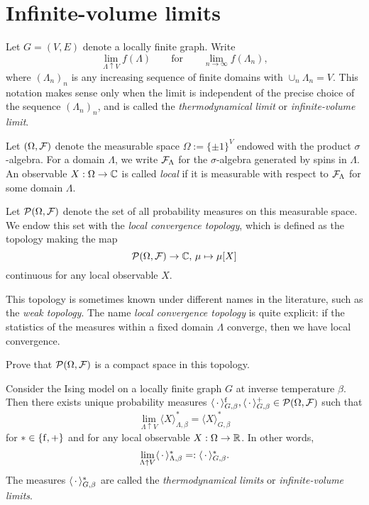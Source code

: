 \section{Infinite-volume limits}
\label{sec:vanishing_magnetisation}

\begin{definition}
    Let $G=(V,E)$ denote a locally finite graph.
    Write
    \[
        \lim_{\Lambda\uparrow V}f(\Lambda)
        \qquad\text{for}\qquad
        \lim_{n\to\infty}f(\Lambda_n),
    \]
where $(\Lambda_n)_n$ is any increasing sequence of finite domains 
with $\cup_n\Lambda_n=V$.
This notation makes sense only when the limit is independent
of the precise choice of the sequence $(\Lambda_n)_n$,
and is called the \emph{thermodynamical limit} or \emph{infinite-volume limit}.

Let $(\Omega,\mathcal F)$ denote the measurable space $\Omega:=\{\pm1\}^V$
endowed with the product $\sigma$-algebra.
For a domain $\Lambda$, we write $\mathcal F_\Lambda$
for the $\sigma$-algebra generated by spins in $\Lambda$.
An observable $X:\Omega\to\mathbb C$ is called \emph{local} if it is measurable
with respect to $\mathcal F_\Lambda$ for some domain $\Lambda$.

Let $\mathcal P(\Omega,\mathcal F)$ denote the set of all probability measures
on this measurable space.
We endow this set with the \emph{local convergence topology},
which is defined as the topology making the map
\[
    \mathcal P(\Omega,\mathcal F)\to\mathbb C,\,\mu\mapsto\mu[X]
\]
continuous for any local observable $X$.
\end{definition}

\begin{remark*}
    This topology is sometimes known under different names in the literature,
    such as the \emph{weak topology}.
    The name \emph{local convergence topology} is quite explicit:
    if the statistics of the measures within a fixed domain $\Lambda$ converge,
    then we have local convergence.
\end{remark*}

\begin{exercise}
    Prove that $\mathcal P(\Omega,\mathcal F)$ is a compact space in this topology.
\end{exercise}

\begin{theorem}
    Consider the Ising model on a locally finite graph $G$
    at inverse temperature $\beta$.
    Then there exists unique probability measures
    $\langle\,\cdot\,\rangle_{G,\beta}^{\operatorname{f}},\langle\,\cdot\,\rangle^+_{G,\beta}\in\mathcal P(\Omega,\mathcal F)$
    such that
    \[
        \lim_{\Lambda\uparrow V}\langle X\rangle_{\Lambda,\beta}^*=\langle X\rangle_{G,\beta}^*
    \]
    for $*\in\{{\operatorname{f}},+\}$ and
    for any local observable $X:\Omega\to\mathbb R$.
    In other words,
    \[
        \lim_{\Lambda\uparrow V}\langle \,\cdot\,\rangle_{\Lambda,\beta}^*
        =:
        \langle \,\cdot\,\rangle_{G,\beta}^*.
    \]
    The measures $\langle\,\cdot\,\rangle_{G,\beta}^*$ are called
    the \emph{thermodynamical limits} or \emph{infinite-volume limits}.
\end{theorem}

